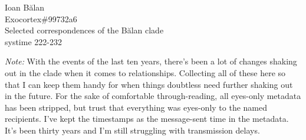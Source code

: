 Ioan Bălan\\
Exocortex\#99732a6\\
Selected correspondences of the Bălan clade\\
systime 222-232

\emph{Note:} With the events of the last ten years, there's been a lot of changes shaking out in the clade when it comes to relationships. Collecting all of these here so that I can keep them handy for when things doubtless need further shaking out in the future. For the sake of comfortable through-reading, all eyes-only metadata has been stripped, but trust that everything was eyes-only to the named recipients. I've kept the timestamps as the message-sent time in the metadata. It's been thirty years and I'm still struggling with transmission delays.
